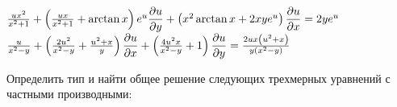 	\begin{enumtasks}

		\label{nonlinsys_quazilinear:dim2_hard}
		\itemstar \( \frac{ux^2}{x^2 + 1} + \left( \frac{ux}{x^2 + 1} + \arctan{x} \right) e^u \dfrac{\partial u}{\partial y} + \left( x^2 \arctan{x} + 2 xy e^u \right) \dfrac{\partial u}{\partial x} = 2 y e^{u} \) %
		\itemstar \( \frac{u}{x^2 - y} + \left( \frac{2 u^2}{x^2 - y} + \frac{u^2 + x}{y} \right) \dfrac{\partial u}{\partial x} + \left( \frac{4 u^2 x}{x^2 - y} + 1 \right) \dfrac{\partial u}{\partial y} = \frac{2 u x \left( u^2 + x \right)}{y \left( x^2 - y \right)} \) %

	\end{enumtasks}

	Определить тип и найти общее решение следующих трехмерных уравнений с частными производными:

